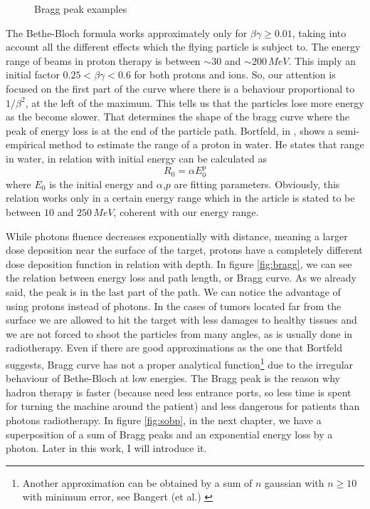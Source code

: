 \documentclass[12pt, a4paper, twoside]{book}
\begin{document}
\begin{figure}[!ht]
     \hfill
\hspace{2mm}
\caption{Bragg peak examples}
   \end{figure}
The Bethe-Bloch formula works approximately only for $\beta\gamma\ge 0.01$, taking into account all the different effects which the flying particle is subject to. The energy range of beams in proton therapy is between $\sim30$ and $\sim200\,MeV$. This imply an initial factor $0.25<\beta\gamma<0.6$ for both protons and ions. So, our attention is focused on the first part of the curve where there is a behaviour proportional to $1/\beta^2$, at the left of the maximum. This tells us that the particles lose more energy as the become slower. That determines the shape of the bragg curve where the peak of energy loss is at the end of the particle path.
Bortfeld, in \cite{bort:bragg}, shows a semi-empirical method to estimate the range of a proton in water. He states that range in water, in relation with initial energy can be calculated as
\[
R_0 = \alpha E_0^p
\]
where $E_0$ is the initial energy and $\alpha$,$p$ are fitting parameters. Obviously, this relation works only in a certain energy range which in the article is stated to be between $10$ and $250\,MeV$, coherent with our energy range.

While photons fluence decreases exponentially with distance, meaning a larger dose deposition near the surface of the target, protons have a completely different dose deposition function in relation with depth.
In figure \ref{fig:bragg}, we can see the relation between energy loss and path length, or Bragg curve. As we already said, the peak is in the last part of the path. We can notice the advantage of using protons instead of photons. In the cases of tumors located far from the surface we are allowed to hit the target with less damages to healthy tissues and we are not forced to shoot the particles from many angles, as is usually done in radiotherapy.
Even if there are good approximations as the one that Bortfeld suggests, Bragg curve has not a proper analytical function\footnote{Another approximation can be obtained by a sum of $n$ gaussian with $n\geq 10$ with minimum error, see Bangert (et al.) \cite{bang:apm}} due to the irregular behaviour of Bethe-Bloch at low energies. The Bragg peak is the reason why hadron therapy is faster (because need less entrance ports, so less time is spent for turning the machine around the patient) and less dangerous for patients than photons radiotherapy. 
In figure \ref{fig:sobp}, in the next chapter, we have a superposition of a sum of Bragg peaks and an exponential energy loss by a photon. Later in this work, I will introduce it.
\end{document}
